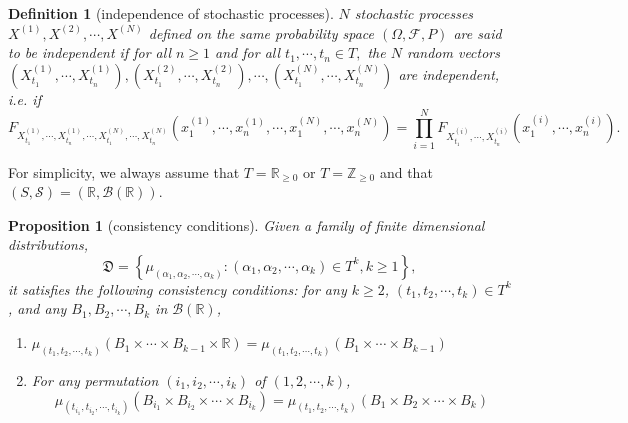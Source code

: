 \documentclass{report}
\newtheorem{definition}{Definition}[section]
\newtheorem{proposition}{Proposition}[section]
\theoremstyle{nonumberplain}
\begin{document}
\begin{definition}[independence of stochastic processes]
	$N$ stochastic processes $X^{(1)},X^{(2)},\cdots,X^{(N)}$ defined on the same probability space $(\Omega, \mathcal{F}, P)$ are said to be independent if for all $n\ge1$ and for all $t_{1}, \cdots, t_{n} \in T,$ the $N$ random vectors $\left(X^{(1)}_{t_{1}}, \cdots, X^{(1)}_{t_{n}}\right), \left(X^{(2)}_{t_{1}}, \cdots, X^{(2)}_{t_{n}}\right),\cdots,\left(X^{(N)}_{t_{1}}, \cdots, X^{(N)}_{t_{n}}\right)$ are independent, i.e. if
	\[
	F_{X^{(1)}_{t_{1}}, \cdots, X^{(1)}_{t_{n}}, \cdots, X^{(N)}_{t_{1}}, \cdots, X^{(N)}_{t_{n}}}\left(x^{(1)}_{1}, \cdots, x^{(1)}_{n}, \cdots, x^{(N)}_{1}, \cdots, x^{(N)}_{n}\right)=\prod_{i=1}^N F_{X^{(i)}_{t_1}, \cdots, X^{(i)}_{t_{n}}}\left(x^{(i)}_{1}, \cdots, x^{(i)}_{n}\right) .
	\]
\end{definition}

For simplicity, we always assume that $T=\mathbb{R}_{\ge 0}$ or $T=\mathbb{Z}_{\ge 0}$ and that $(S,\mathcal{S})=(\mathbb{R},\mathcal{B}(\mathbb{R}))$.

\begin{proposition}[consistency conditions]
	Given a family of finite dimensional distributions,
	$$
	\mathfrak{D}=\left\{\mu_{\left(\alpha_{1}, \alpha_{2}, \cdots, \alpha_{k}\right)}:\left(\alpha_{1}, \alpha_{2}, \cdots, \alpha_{k}\right) \in T^{k}, k\ge1 \right\},
	$$
	it satisfies the following consistency conditions: for any $k\ge2$, $\left(t_{1}, t_{2}, \cdots, t_{k}\right) \in T^k$, and any $B_{1}, B_{2}, \cdots, B_{k}$ in $\mathcal{B}(\mathbb{R})$,
	\begin{enumerate}
		\item[(C1)] $\mu_{\left(t_{1}, t_{2}, \cdots, t_{k}\right)}\left(B_{1} \times \cdots \times B_{k-1} \times \mathbb{R}\right)=\mu_{\left(t_{1}, t_{2}, \cdots, t_{k}\right)}\left(B_{1} \times \cdots \times B_{k-1}\right)$
		\item[(C2)] For any permutation $\left(i_{1}, i_{2}, \cdots, i_{k}\right)$ of $(1,2, \cdots, k)$,
		\[
		\mu_{\left(t_{i_{1}}, t_{i_{2}}, \cdots, t_{i_{k}}\right)}\left(B_{i_{1}} \times B_{i_{2}} \times \cdots \times B_{i_{k}}\right)=\mu_{\left(t_{1}, t_{2}, \cdots, t_{k}\right)}\left(B_{1} \times B_{2} \times \cdots \times B_{k}\right)
		\]
	\end{enumerate}
\end{proposition}
\end{document}
